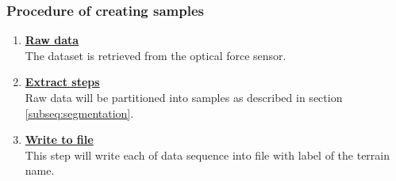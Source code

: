 \documentclass[USenglish]{ifimaster}  %
\begin{document}
\subsubsection{Procedure of creating samples} \label{sub:createsamples}
	\begin{enumerate}
		\item \textbf{\underline{Raw data}}
		\\
		The dataset is retrieved from the optical force sensor.
		
		\item \textbf{\underline{Extract steps}}
		\\
		Raw data will be partitioned into samples as described in section \ref{subseq:segmentation}.
		
		\item \textbf{\underline{Write to file}}
		\\
		This step will write each of data sequence into file with label of the terrain name.
		
		
\end{enumerate}
\clearpage
\end{document}
